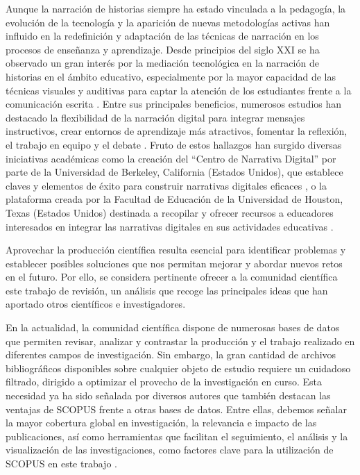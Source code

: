 Aunque la narración de historias siempre ha estado vinculada a la
pedagogía, la evolución de la tecnología y la aparición de nuevas
metodologías activas han influido en la redefinición y adaptación de las
técnicas de narración en los procesos de enseñanza y aprendizaje. Desde
principios del siglo XXI se ha observado un gran interés por la
mediación tecnológica en la narración de historias en el ámbito
educativo, especialmente por la mayor capacidad de las técnicas visuales
y auditivas para captar la atención de los estudiantes frente a la
comunicación escrita \cite{suwardy2013using}. Entre sus principales
beneficios, numerosos estudios han destacado la flexibilidad de la
narración digital para integrar mensajes instructivos, crear entornos de
aprendizaje más atractivos, fomentar la reflexión, el trabajo en equipo
y el debate \cite{beck2021digital,smeda2014effectiveness,tiba2015digital}. Fruto de estos hallazgos han surgido diversas iniciativas
académicas como la creación del \enquote{Centro de Narrativa Digital} por
parte de la Universidad de Berkeley, California (Estados Unidos), que
establece claves y elementos de éxito para construir narrativas
digitales eficaces \cite{robin2008effective}, o la plataforma creada por la Facultad
de Educación de la Universidad de Houston, Texas (Estados Unidos)
destinada a recopilar y ofrecer recursos a educadores interesados en
integrar las narrativas digitales en sus actividades educativas
\cite{rudnicki2006buzz}.

Aprovechar la producción científica resulta esencial para identificar
problemas y establecer posibles soluciones que nos permitan mejorar y
abordar nuevos retos en el futuro. Por ello, se considera pertinente
ofrecer a la comunidad científica este trabajo de revisión, un análisis
que recoge las principales ideas que han aportado otros científicos e
investigadores.

En la actualidad, la comunidad científica dispone de numerosas bases de
datos que permiten revisar, analizar y contrastar la producción y el
trabajo realizado en diferentes campos de investigación. Sin embargo, la
gran cantidad de archivos bibliográficos disponibles sobre cualquier
objeto de estudio requiere un cuidadoso filtrado, dirigido a optimizar
el provecho de la investigación en curso. Esta necesidad ya ha sido
señalada por diversos autores \cite{baas_scopus_2020,schotten_brief_2017,vila_gamificacion_2019} que también destacan las ventajas de SCOPUS frente a
otras bases de datos. Entre ellas, debemos señalar la mayor cobertura
global en investigación, la relevancia e impacto de las publicaciones,
así como herramientas que facilitan el seguimiento, el análisis y la
visualización de las investigaciones, como factores clave para la
utilización de SCOPUS en este trabajo \cite{alryalat2019comparing,chadegani2013comparison,singh2024large}.
